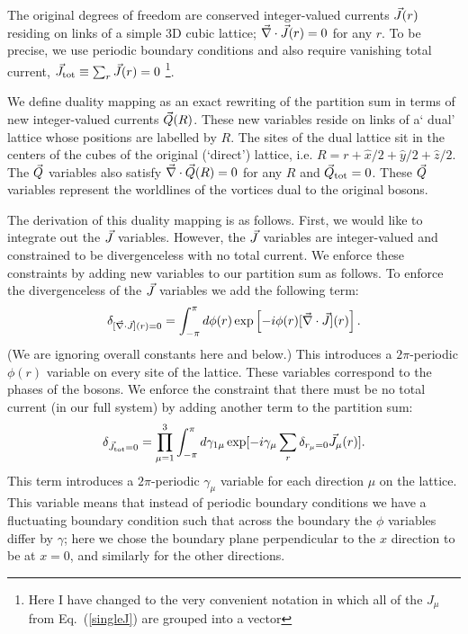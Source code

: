  The original degrees of freedom are conserved integer-valued currents $\vec{J}(r)$ residing on links of a simple 3D cubic lattice; $\vec{\nabla} \cdot \vec{J}(r) = 0$ for any $r$.  To be precise, we use periodic boundary conditions and also require vanishing total current, $\vec{J}_{\rm tot} \equiv \sum_r \vec{J}(r) = 0$
\footnote{Here I have changed to the very convenient notation in which all of the $J_\mu$ from Eq.~(\ref{singleJ}) are grouped into a vector \JJ}.  

We define duality mapping as an exact rewriting of the partition sum in terms of new integer-valued currents $\vec{Q}(R)$. These new variables  reside on links of a` dual' lattice whose positions are labelled by $R$. The sites of the dual lattice sit in the centers of the cubes of the original (`direct') lattice, i.e. $R=r+\hat{x}/2+\hat{y}/2+\hat{z}/2$.
The $\vec{Q}$ variables also satisfy $\vec{\nabla} \cdot \vec{Q}(R) = 0$ for any $R$ and $\vec{Q}_{\rm tot} = 0$. These $\vec{Q}$ variables represent the worldlines of the vortices dual to the original bosons. 

The derivation of this duality mapping is as follows.  
 First, we would like to integrate out the $\vec{J}$ variables. However, the $\vec{J}$ variables are integer-valued and constrained to be divergenceless with no total current. We enforce these constraints by adding new variables to our partition sum as follows.
To enforce the divergenceless of the $\vec{J}$ variables we add the following term:
\begin{equation}
\delta_{[\vec{\nabla}\cdot\vec{J}](r)=0}=\int_{-\pi}^{\pi} d\phi(r) \exp\left[-i\phi(r)[\vec{\nabla}\cdot\vec{J}](r)\right].
\label{zphi}
\end{equation}
(We are ignoring overall constants here and below.) This introduces a $2\pi$-periodic $\phi(r)$ variable on every site of the lattice. These variables correspond to the phases of the bosons. We enforce the constraint that there must be no total current (in our full system) by adding another term to the partition sum:
\begin{eqnarray}
\delta_{\vec{J}_{{\rm tot}}=0}=\prod_{\mu=1}^{3}\int_{-\pi}^{\pi} d\gamma_{1\mu} \exp[-i\gamma_{\mu}\sum_r \delta_{r_\mu=0}\vec{J}_{\mu}(r)].
\label{zgamma}
\end{eqnarray}
This term introduces a $2\pi$-periodic $\gamma_{\mu}$ variable for each direction $\mu$ on the lattice. This variable means that instead of periodic boundary conditions we have a fluctuating boundary condition such that across the boundary the $\phi$ variables differ by $\gamma$; here we chose the boundary plane perpendicular to the $x$ direction to be at $x=0$, and similarly for the other directions.
 
